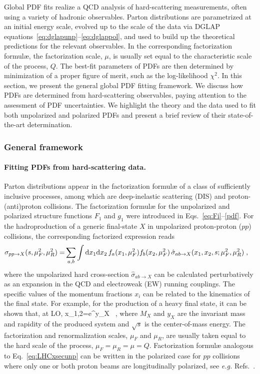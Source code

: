 Global PDF fits realize a QCD analysis of hard-scattering measurements,
often using a variety of hadronic observables.
%
Parton distributions are parametrized at an initial energy scale, 
evolved up to the scale of the data via DGLAP 
equations~\eqref{eq:dglapunp}--\eqref{eq:dglappol}, and used to build up the 
theoretical predictions for the relevant observables.
%
In the corresponding factorization formul\ae, the factorization scale, $\mu$,
is usually set equal to the characteristic scale of the process, $Q$.
%
The best-fit parameters of PDFs are then determined by minimization of a 
proper figure of merit, such as the log-likelihood $\chi^2$.
%
In this section, we present the general global PDF fitting framework.
%
We discuss how PDFs are determined from hard-scattering observables,
paying attention to the assessment of PDF uncertainties.
%
We highlight the theory and the data used to fit both unpolarized and 
polarized PDFs and present a brief review of their state-of-the-art 
determination.

\subsubsection{General framework}
\label{sec:genframework}

\paragraph*{Fitting PDFs from hard-scattering data.} 
Parton distributions appear in the factorization formul{\ae} of a class of 
sufficiently inclusive processes, among which are deep-inelastic scattering 
(DIS) and proton-(anti)proton collisions.
%
The factorization formul{\ae} for the unpolarized and polarized structure 
functions $F_1$ and $g_1$ were introduced in Eqs.~\eqref{eq:Fi}--\eqref{pdf}.
%
For the hadroproduction of a generic final-state $X$ in unpolarized 
proton-proton ($pp$) collisions, the corresponding factorized expression reads
\begin{align}
\sigma_{pp\to X}(s,\mu^2_F,\mu^2_R)=&\sum_{a,b}\int {\rm d}x_1 {\rm d}x_2\, 
f_a(x_1,\mu_F^2)f_b(x_2,\mu_F^2)\,
\hat{\sigma}_{ab\to X}(x_1,x_2,s;\mu^2_{F},\mu^2_R)\;,
\label{eq:LHCxsecunp}
\end{align}
where the unpolarized hard cross-section 
$\hat{\sigma}_{ab\to X}$ can be calculated 
perturbatively as an expansion in the QCD and electroweak (EW) 
running couplings.
%
The specific values of the momentum fractions
$x_i$ can be related to the kinematics of the final state.
%
For example, for the production of a heavy final state, 
it can be shown that, at LO,
\be
x_{1,2}=e^{\pm y_X} \, ,
\ee
where $M_X$ and $y_X$ are the invariant mass and rapidity of the produced 
system and $\sqrt{s}$ is the center-of-mass energy.
%
The factorization and renormalization scales, $\mu_F$ and $\mu_R$, are 
usually taken equal to the hard scale of the process, $\mu_F=\mu_R=\mu=Q$.
%
Factorization formul{\ae} analogous to Eq.~\eqref{eq:LHCxsecunp} can be
written in the polarized case for $pp$ collisions where only one or
both proton beams are longitudinally polarized, see {\it e.g.}
Refs.~\cite{Stratmann:2001pb,Nadolsky:2003fz}.

